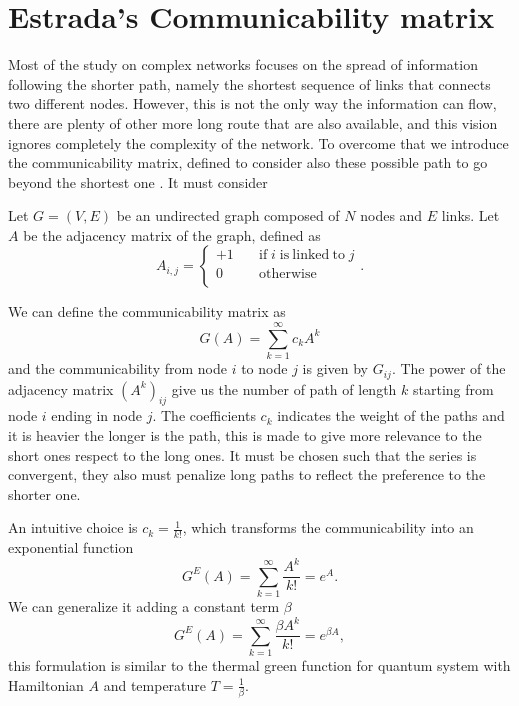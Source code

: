 \section{Estrada's Communicability matrix}

Most of the study on complex networks focuses on the spread of information following the shorter path, namely the shortest sequence of links that connects two different nodes. 
However, this is not the only way the information can flow, there are plenty of other more long route that are also available, and this vision ignores completely the complexity of the network.
To overcome that we introduce the communicability matrix, defined to consider also these possible path to go beyond the shortest one \cite{Estrada_2012}. It must consider 

Let  $G=(V,E)$ be an undirected graph composed of $N$ nodes and $E$ links. 
Let $A$ be the adjacency matrix of the graph, defined as
\begin{equation}
    A_{i, j }= \left\{ \begin{aligned}
        +1 &\quad \mathrm{if} \; i \; \mathrm{is ~linked ~to} \; j \\
        0 &\quad \mathrm{otherwise} \\
    \end{aligned} \right.  .
\end{equation}
 
We can define the communicability matrix as
\begin{equation}
    G(A) = \sum_{k=1}^{\infty}c_k A^k
\end{equation}
and the communicability from node $i$ to node $j$ is given by $G_{ij}$. The power of the adjacency matrix $(A^k)_{ij}$ give us the number of path of length $k$ starting from node $i$ ending in node $j$.
The coefficients $c_k$ indicates the weight of the paths and it is heavier the longer is the path, this is made to give more relevance to the short ones respect to the long ones. It must be chosen such that the series is convergent, they also must penalize long paths to reflect the preference to the shorter one.

An intuitive choice is $c_k = \frac{1}{k!}$, which transforms the communicability into an exponential function \cite{Estrada_2008}
\begin{equation}\label{G_E}
    G^E(A) =\sum_{k=1}^{\infty} \frac{A^k}{k!} = e^{A} .
\end{equation}
We can generalize it adding a constant term $\beta$
\begin{equation}\label{G_R}
    G^E(A) =\sum_{k=1}^{\infty} \frac{\beta A^k}{k!} = e^{\beta A} ,
\end{equation}
this formulation is similar to the thermal green function for quantum system with Hamiltonian $A$ and temperature $T = \frac{1}{\beta}$.

